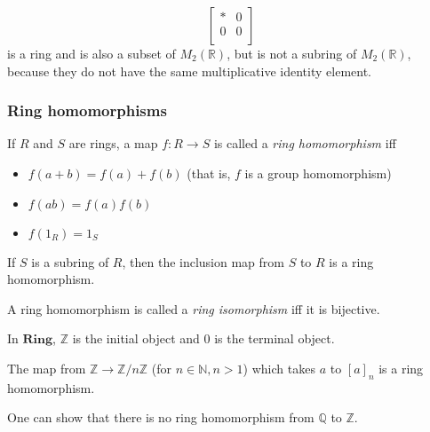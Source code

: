 \documentclass[12pt]{article}
\begin{document}
\[ \begin{bmatrix}
    * & 0 \\
    0 & 0 \\
\end{bmatrix} \]
is a ring and is also a subset of $M_2( \mathbb{R})$, but is not a subring of $M_2( \mathbb{R})$, because they do not have the same multiplicative identity element.

\subsubsection{Ring homomorphisms}
If $R$ and $S$ are rings, a map $f: R \rightarrow S$ is called a \textit{ring homomorphism} iff
\begin{itemize}
    \item $f(a+b)=f(a)+f(b)$ (that is, $f$ is a group homomorphism)
    \item $f(ab)=f(a)f(b)$
    \item $f(1_R)=1_S$
\end{itemize}
If $S$ is a subring of $R$, then the inclusion map from $S$ to $R$ is a ring homomorphism.
\par
A ring homomorphism is called a \textit{ring isomorphism} iff it is bijective.
\par
In $\mathbf{Ring}$, $\mathbb{Z}$ is the initial object and $0$ is the terminal object.
\par
The map from $ \mathbb{Z} \rightarrow \mathbb{Z}/n \mathbb{Z}$ (for $n \in \mathbb{N}, n>1$) which takes $a$ to $[a]_n$ is a ring homomorphism.
\par
One can show that there is no ring homomorphism from $ \mathbb{Q}$ to $ \mathbb{Z}$.
\end{document}
